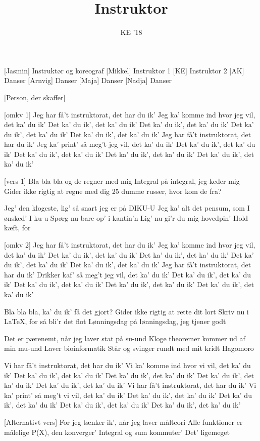 \documentclass[a4paper,11pt]{article}
\title{Instruktor}
\author{KE '18}
\begin{document}
\maketitle

\begin{roles}
[Jasmin] Instruktør og koreograf
[Mikkel] Instruktor 1
[KE] Instruktor 2
[AK] Danser
[Arnvig] Danser
[Maja] Danser
[Nadja] Danser
\end{roles}

\begin{props}
[Person, der skaffer]
\end{props}


\begin{song}
[omkv 1]%
Jeg har få’t instruktorat, det har du ik’
Jeg ka’ komme ind hvor jeg vil, det ka’ du ik’
Det ka’ du ik’, det ka’ du ik’
Det ka’ du ik’, det ka’ du ik’
Det ka’ du ik’, det ka’ du ik’
Det ka’ du ik’, det ka’ du ik’
Jeg har få’t instruktorat, det har du ik’
Jeg ka’ print’ så meg’t jeg vil, det ka’ du ik’
Det ka’ du ik’, det ka’ du ik’
Det ka’ du ik’, det ka’ du ik’
Det ka’ du ik’, det ka’ du ik’
Det ka’ du ik’, det ka’ du ik’

[vers 1]%
Bla bla bla og de regner med mig
Integral på integral, jeg keder mig
Gider ikke rigtig at regne med dig
25 dumme russer, hvor kom de fra?

Jeg’ den klogeste, lig’ så snart jeg er på DIKU-U
Jeg ka’ alt det pensum, som I ønsked’ I ku-u
Spørg nu bare op’ i kantin’n
Lig’ nu gi’r du mig hovedpin’
Hold kæft, for

[omkv 2]%
Jeg har få’t instruktorat, det har du ik’
Jeg ka’ komme ind hvor jeg vil, det ka’ du ik’
Det ka’ du ik’, det ka’ du ik’
Det ka’ du ik’, det ka’ du ik’
Det ka’ du ik’, det ka’ du ik’
Det ka’ du ik’, det ka’ du ik’
Jeg har få’t instruktorat, det har du ik’
Drikker kaf’ så meg’t jeg vil, det ka’ du ik’
Det ka’ du ik’, det ka’ du ik’
Det ka’ du ik’, det ka’ du ik’
Det ka’ du ik’, det ka’ du ik’
Det ka’ du ik’, det ka’ du ik’

%
Bla bla bla, ka’ du ik’ få det gjort?
Gider ikke rigtig at rette dit lort
Skriv nu i LaTeX, for så bli’r det flot
Lønningsdag på lønningsdag, jeg tjener godt

Det er pærenemt, når jeg laver stat på su-und
Kloge theoremer kommer ud af min mu-und
Laver bioinformatik
Står og svinger rundt med mit kridt
Hagomoro

%
Vi har få’t instruktorat, det har du ik’
Vi ka’ komme ind hvor vi vil, det ka’ du ik’
Det ka’ du ik’, det ka’ du ik’
Det ka’ du ik’, det ka’ du ik’
Det ka’ du ik’, det ka’ du ik’
Det ka’ du ik’, det ka’ du ik’
Vi har få’t instruktorat, det har du ik’
Vi ka’ print’ så meg’t vi vil, det ka’ du ik’
Det ka’ du ik’, det ka’ du ik’
Det ka’ du ik’, det ka’ du ik’
Det ka’ du ik’, det ka’ du ik’
Det ka’ du ik’, det ka’ du ik’

[Alternativt vers]%
For jeg tænker ik’, når jeg laver målteori
Alle funktioner er målelige
P(X), den konverger’
Integral og sum kommuter’
Det’ ligemeget
\end{song}
\end{document}
